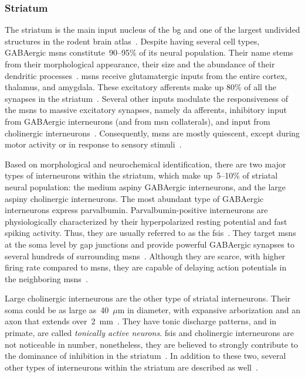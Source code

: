 \subsubsection{Striatum} \label{intro:anatomy:striatum}
The striatum is the main input nucleus of the \gls{bg} and one of the largest undivided structures in the rodent brain atlas~\cite{Hintiryan2016NN,Hunnicutt2016}.
Despite having several cell types, GABAergic \glspl{msn} constitute~90--95\% of its neural population.
Their name stems from their morphological appearance, their size and the abundance of their dendritic processes~\cite{TURNER2000BasalFunction}.
\Glspl{msn} receive glutamatergic inputs from the entire cortex, thalamus, and amygdala.
These excitatory afferents make up 80\% of all the synapses in the striatum~\cite{Wilson2007GABAergicNeostriatum}.
Several other inputs modulate the responsiveness of the \glspl{msn} to massive excitatory synapses, namely \gls{da} afferents, inhibitory input from GABAergic interneurons (and from \gls{msn} collaterals), and input from cholinergic interneurons~\cite{Dudman2015Book}.
Consequently, \glspl{msn} are mostly quiescent, except during motor activity or in response to sensory stimuli~\cite{KandelBook2001}.
\par
Based on morphological and neurochemical identification, there are two major types of interneurons within the striatum, which make up~5--10\% of striatal neural population:
    the medium aspiny GABAergic interneurons, and the large aspiny cholinergic interneurons.
The most abundant type of GABAergic interneurons express parvalbumin.
Parvalbumin-positive interneurons are physiologically characterized by their hyperpolarized resting potential and fast spiking activity.
Thus, they are usually referred to as the \glspl{fsi}~\cite{Dudman2015Book}.
They target \glspl{msn} at the soma level by gap junctions and provide powerful GABAergic synapses to several hundreds of surrounding \glspl{msn}~\cite{Grillner2016BG, Gage2010FSI}.
Although they are scarce, with higher firing rate compared to \glspl{msn}, they are capable of delaying action potentials in the neighboring \glspl{msn}~\cite{Wilson2007GABAergicNeostriatum}.
\par
Large cholinergic interneurons are the other type of striatal interneurons.
Their soma could be as large as~40~$\mu$m in diameter, with expansive arborization and an axon that extends over~2~mm~\cite{Dudman2015Book}.
They have tonic discharge patterns, and in primate, are called \textit{tonically active neurons}.
\Glspl{fsi} and cholinergic interneurons are not noticeable in number, nonetheless, they are believed to strongly contribute to the dominance of inhibition in the striatum~\cite{Gage2010FSI}.
In addition to these two, several other types of interneurons within the striatum are described as well~\cite[see][]{Grillner2016BG, Dudman2015Book}.

